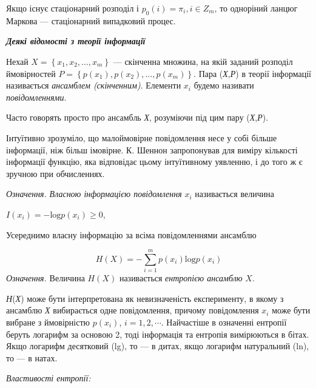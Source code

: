 \bigskip

Якщо існує стаціонарний розподіл  і   ${p_{{0}}(i)=\pi _{{i}},i\in Z_{{m}}}$, то
одноріний ланцюг Маркова --- стаціонарний випадковий процес.


\bigskip

{\centering\bfseries\itshape
Деякі відомості з теорії інформації
\par}

 Нехай  ${X=\left\{x_{{1}},x_{{2}},\dots,x_{{m}}\right\}}$ ---
скінченна множина, на якій заданий розподіл ймовірностей 
${P=\left\{p(x_{{1}}),p(x_{{2}}),\dots,p(x_{{m}})\right\}}$.
Пара (\textit{Х},\textit{Р}) в теорії інформації називається \textit{ансамблем
(скінченним)}. Елементи  ${x_{{i}}}$ будемо називати \textit{повідомленнями}.

 Часто говорять просто про ансамбль \textit{Х}, розуміючи під цим пару
(\textit{Х},\textit{Р}).

 Інтуїтивно зрозуміло, що малоймовірне повідомлення несе у собі  більше
інформації, ніж більш імовірне. К. Шеннон запропонував для виміру кількості
інформації функцію, яка відповідає цьому інтуїтивному уявленню, і до того ж  є
зручною при обчисленнях.

\textit{Означення.} \textit{ Власною інформацією повідомлення}  ${x_{{i}}}$
називається величина

{\centering
 ${I(x_{{i}})=-\text{log}p(x_{{i}})\ge 0}$,
\par}

 Усереднимо власну інформацію за всіма повідомленнями ансамблю

\begin{equation*}
{H(X)=-\overset{{m}}{\underset{{i=1}}{\sum }}{p(x_{{i}})\text{log}p(x_{{i}})}}
\end{equation*}
\textit{Означення.} Величина  ${H(X)}$ називається \textit{ентропією ансамблю} 
${X}$.

\textit{Н}(\textit{Х}) може бути інтерпретована як невизначеність експерименту,
в  якому  з ансамблю \textit{Х }вибирається одне повідомлення, причому
повідомлення   ${x_{{i}}}$ може бути вибране з ймовірністю ${p(x_{{i}})}$,
${i=1,2,\dotsm\text{.}}$ Найчастіше в означенні ентропії
беруть логарифм за основою 2, тоді інформація та ентропія вимірюються в бітах.
Якщо логарифм десятковий (lg), то --- в дитах, якщо логарифм натуральний (ln), то
--- в натах.


\bigskip

{\itshape
Властивості ентропії:}


